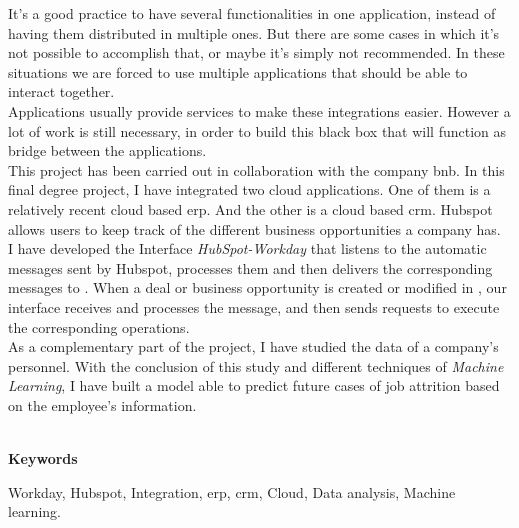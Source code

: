 	It's a good practice to have several functionalities in one application, instead of having them distributed in multiple ones. But there are some cases in which
	it’s not possible to accomplish that, or maybe it's simply not recommended. In these situations we are
	forced to use multiple applications that should be able to interact together.\\

	Applications usually provide services to make these integrations easier. However a lot of work is still necessary, in order to build this black box that will function as bridge between the applications.\\
	
	This project has been carried out in collaboration with the company \acrfull{bnb}. In this final degree project, I have integrated two cloud applications. One of
	them is \wday{} a relatively recent cloud based \acrshort{erp}. And the other is \hs{} a cloud based \acrshort{crm}.
	Hubspot allows users to keep track of the different business opportunities a company has.\\
	
	I have developed the Interface \textit{HubSpot-Workday} that listens to the automatic messages sent by Hubspot,
	processes them and then delivers the corresponding messages to \wday{}. When a deal or business
	opportunity is created or modified in \hs{}, our interface receives and processes the message, and then sends \wday{} requests to execute the corresponding operations.\\

	As a complementary part of the project, I have studied the data of a company’s personnel. 
	With the conclusion of this study and different techniques of \textit{Machine Learning}, I have
	built a model able to predict future cases of job attrition based on the employee's information.\\

	
	
	
	\
	
	\textbf{Keywords}
    
    Workday, Hubspot, Integration, \acrfull{erp}, \acrfull{crm}, Cloud, Data analysis, Machine learning.
	
	

